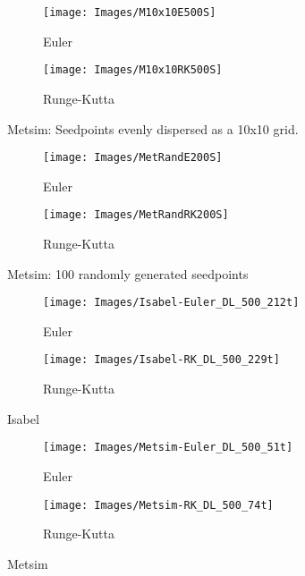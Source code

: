\documentclass[11pt,a4paper,english]{article}
\numberwithin{equation}{section}
\begin{document}
\newpage
\begin{figure}[ht]
	\centering
	\hspace*{-1.5cm}
	\begin{subfigure}{.6\textwidth}
		\centering
		\texttt{[image: Images/M10x10E500S]}
		\caption{Euler}
		\label{fig:sub1}
	\end{subfigure}%
	\begin{subfigure}{.6\textwidth}
		\centering
		\texttt{[image: Images/M10x10RK500S]}
		\caption{Runge-Kutta}
		\label{fig:sub2}
	\end{subfigure}
	\caption{Metsim: Seedpoints evenly dispersed as a 10x10 grid.}
	\label{fig:test}
\end{figure}
\begin{figure}[ht]
	\centering
	\hspace*{-1.5cm}
	\begin{subfigure}{.6\textwidth}
		\centering
		\texttt{[image: Images/MetRandE200S]}
		\caption{Euler}
		\label{fig:sub1}
	\end{subfigure}%
	\begin{subfigure}{.6\textwidth}
		\centering
		\texttt{[image: Images/MetRandRK200S]}
		\caption{Runge-Kutta}
		\label{fig:sub2}
	\end{subfigure}
	\caption{Metsim: 100 randomly generated seedpoints}
	\label{fig:test}
\end{figure}

\newpage
\begin{figure}[ht]
	\centering
	\hspace*{-1.5cm}
	\begin{subfigure}{.6\textwidth}
		\centering
		\texttt{[image: Images/Isabel-Euler\_DL\_500\_212t]}
		\caption{Euler}
		\label{fig:sub1}
	\end{subfigure}%
	\begin{subfigure}{.6\textwidth}
		\centering
		\texttt{[image: Images/Isabel-RK\_DL\_500\_229t]}
		\caption{Runge-Kutta}
		\label{fig:sub2}
	\end{subfigure}
	\caption{Isabel}
	\label{fig:test}
\end{figure}
\begin{figure}[ht]
	\centering
	\hspace*{-1.5cm}
	\begin{subfigure}{.6\textwidth}
		\centering
		\texttt{[image: Images/Metsim-Euler\_DL\_500\_51t]}
		\caption{Euler}
		\label{fig:sub1}
	\end{subfigure}%
	\begin{subfigure}{.6\textwidth}
		\centering
		\texttt{[image: Images/Metsim-RK\_DL\_500\_74t]}
		\caption{Runge-Kutta}
		\label{fig:sub2}
	\end{subfigure}
	\caption{Metsim}
	\label{fig:test}
\end{figure}
\end{document}
